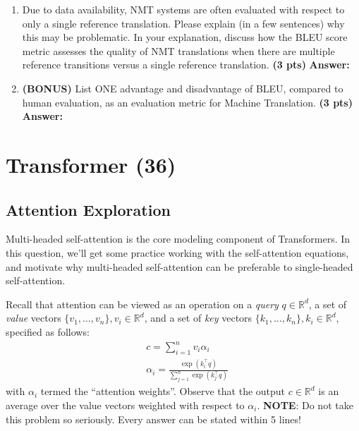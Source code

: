 \documentclass{assignment format}
\newenvironment{answer}{
    {\bf Answer:} \begingroup\color{red}
}{\endgroup}%
\begin{document}
\begin{enumerate}[label=(\alph*)]
\begin{enumerate}[label=(\roman*)]
    Please compute the BLEU scores for $\mathbf{c}_1$. Let $\lambda_i=0.5$ for $i\in\{1,2\}$ and $\lambda_i=0$ for $i\in\{3,4\}$ (\textbf{this means we ignore 3-grams and 4-grams}, i.e., don't compute $p_3$ or $p_4$). When computing BLEU scores, show your working (i.e., show your computed values for $p_1$, $p_2$, $len(c)$, $len(r)$ and $BP$). Note that the BLEU scores can be expressed between 0 and 1 or between 0 and 100. The code is using the 0 to 100 scale while in this question we are using the \textbf{0 to 1} scale. \textbf{(6 pts)}
    \begin{answer}
    \end{answer}
    \item Due to data availability, NMT systems are often evaluated with respect to only a single reference translation. Please explain (in a few sentences) why this may be problematic. In your explanation, discuss how the BLEU score metric assesses the quality of NMT translations when there are multiple reference transitions versus a single reference translation. \textbf{(3 pts)}
    \begin{answer}
    \end{answer}
    \item \textbf{(BONUS)} List ONE advantage and disadvantage of BLEU, compared to human evaluation, as an evaluation metric for Machine Translation. \textbf{(3 pts)}
    \begin{answer}
    \end{answer}
    \end{enumerate}
\end{enumerate}


\section{Transformer (36)}
\subsection{Attention Exploration}

Multi-headed self-attention is the core modeling component of Transformers.
In this question, we'll get some practice working with the self-attention equations, and motivate why multi-headed self-attention can be preferable to single-headed self-attention.

Recall that attention can be viewed as an operation on a \textit{query} $q\in\mathbb{R}^d$, a set of \textit{value} vectors $\{v_1,\dots,v_n\}, v_i\in\mathbb{R}^d$, and a set of \textit{key} vectors $\{k_1,\dots,k_n\}, k_i \in \mathbb{R}^d$, specified as follows:
\begin{align}
&c = \sum_{i=1}^{n} v_i \alpha_i \\
&\alpha_i = \frac{\exp(k_i^\top q)}{\sum_{j=1}^{n} \exp(k_j^\top q)}
\end{align} 
with $\alpha_i$ termed the ``attention weights''. 
Observe that the output $c\in\mathbb{R}^d$ is an average over the value vectors weighted with respect to $\alpha_i$.
\newline
\textbf{NOTE}: Do not take this problem so seriously. Every answer can be stated within 5 lines! 
\end{document}
